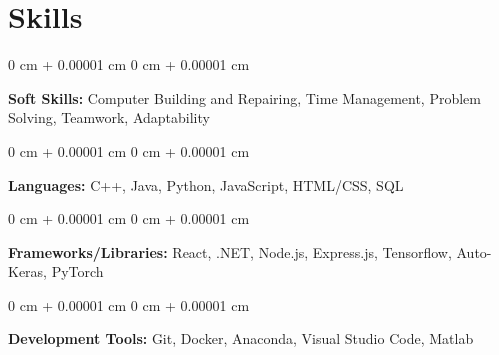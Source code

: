 \documentclass[10pt, letterpaper]{article}
\newenvironment{onecolentry}{
    \begin{adjustwidth}{
        0 cm + 0.00001 cm
    }{
        0 cm + 0.00001 cm
    }
}{
    \end{adjustwidth}
} %
\begin{document}
        \vspace{0.3 cm}



    
    \section{Skills}

        \begin{onecolentry}
            \textbf{Soft Skills:} Computer Building and Repairing, Time Management, Problem Solving, Teamwork, Adaptability
        \end{onecolentry}

        \vspace{0.2 cm}
        
        \begin{onecolentry}
            \textbf{Languages:} C++, Java, Python, JavaScript, HTML/CSS, SQL
        \end{onecolentry}
        
        \vspace{0.2 cm}

        \begin{onecolentry}
            \textbf{Frameworks/Libraries:} React, .NET, Node.js, Express.js, Tensorflow, Auto-Keras, PyTorch
        \end{onecolentry}
        
        \vspace{0.2 cm}

        \begin{onecolentry}
            \textbf{Development Tools:} Git, Docker, Anaconda, Visual Studio Code, Matlab
        \end{onecolentry}


    
\end{document}
